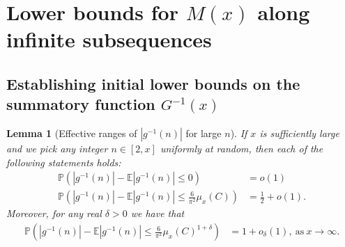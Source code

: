 \documentclass[11pt,reqno,a4letter]{article}
\numberwithin{figure}{section}
\numberwithin{table}{section}
\theoremstyle{plain}
\newtheorem{lemma}[theorem]{Lemma}
\numberwithin{theorem}{section}
\theoremstyle{definition}
\begin{document}
\newpage 
\section{Lower bounds for $M(x)$ along infinite subsequences} 
\label{Section_KeyApplications} 

\subsection{Establishing initial lower bounds on the summatory function $G^{-1}(x)$} 
\label{Section_ProofOfValidityOfAverageOrderLowerBounds} 

\begin{lemma}[Effective ranges of $|g^{-1}(n)|$ for large $n$] 
\label{lemma_ProbsOfAbsgInvnDist_v2} 
If $x$ is sufficiently large and we pick any integer $n \in [2, x]$ uniformly at random, then 
each of the following statements holds: 
\begin{align*} 
\tag{A}
\mathbb{P}\left(|g^{-1}(n)| - \mathbb{E}|g^{-1}(n)| \leq 0\right) & = o(1) \\ 
\tag{B} 
\mathbb{P}\left(|g^{-1}(n)| - \mathbb{E}|g^{-1}(n)| \leq \frac{6}{\pi^2} \mu_x(C)\right) & = 
     \frac{1}{2} + o(1). 
\end{align*} 
Moreover, for any real $\delta > 0$ we have that 
\begin{align*} 
\tag{C} 
\mathbb{P}\left(|g^{-1}(n)| - \mathbb{E}|g^{-1}(n)| \leq \frac{6}{\pi^2} \mu_x(C)^{1 + \delta}\right) & = 
     1 + o_{\delta}(1), 
     \mathrm{\ as\ } x \rightarrow \infty. 
\end{align*} 
\end{lemma} 
\end{document}
